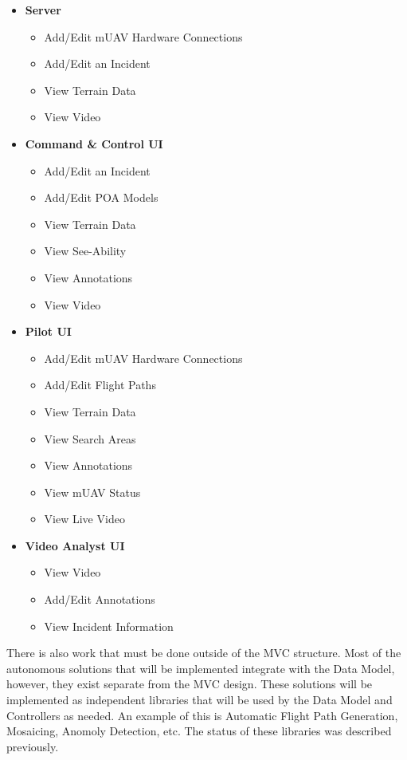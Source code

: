 \documentclass[12pt]{IEEEtran}
\begin{document}
\begin{itemize}
	\item \textbf{Server}
	\begin{itemize}
	  \item Add/Edit mUAV Hardware Connections
	  \item Add/Edit an Incident
	  \item View Terrain Data
	  \item View Video
	\end{itemize}
	
	\item \textbf{Command \& Control UI}
	\begin{itemize}
	  \item Add/Edit an Incident
	  \item Add/Edit POA Models
	  \item View Terrain Data
	  \item View See-Ability
	  \item View Annotations
	  \item View Video
	\end{itemize}
	
	\item \textbf{Pilot UI}
	\begin{itemize}
	  \item Add/Edit mUAV Hardware Connections
	  \item Add/Edit Flight Paths
	  \item View Terrain Data
	  \item View Search Areas
	  \item View Annotations
	  \item View mUAV Status
	  \item View Live Video
	\end{itemize}
	
	\item \textbf{Video Analyst UI}
	\begin{itemize}
	  \item View Video
	  \item Add/Edit Annotations
	  \item View Incident Information
	\end{itemize}
\end{itemize}

There is also work that must be done outside of the MVC structure.  Most of the
autonomous solutions that will be implemented integrate with the Data Model,
however, they exist separate from the MVC design.
These solutions will be implemented as independent libraries that will be used
by the Data Model and Controllers as needed.  An example of this is Automatic
Flight Path Generation, Mosaicing, Anomoly Detection, etc.  The status of
these libraries was described previously.
\end{document}
